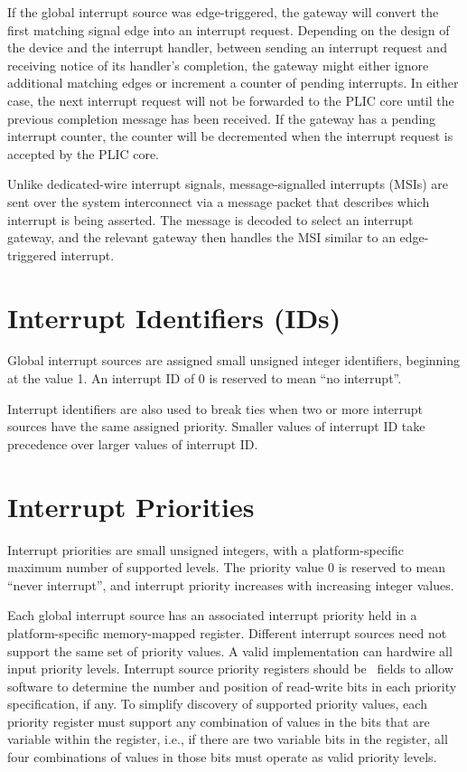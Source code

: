 If the global interrupt source was edge-triggered, the gateway will
convert the first matching signal edge into an interrupt request.
Depending on the design of the device and the interrupt handler,
between sending an interrupt request and receiving notice of its
handler's completion, the gateway might either ignore additional
matching edges or increment a counter of pending interrupts.  In
either case, the next interrupt request will not be forwarded to the
PLIC core until the previous completion message has been received.  If
the gateway has a pending interrupt counter, the counter will be
decremented when the interrupt request is accepted by the PLIC core.

Unlike dedicated-wire interrupt signals, message-signalled interrupts
(MSIs) are sent over the system interconnect via a message packet that
describes which interrupt is being asserted.  The message is decoded
to select an interrupt gateway, and the relevant gateway then handles
the MSI similar to an edge-triggered interrupt.

\section{Interrupt Identifiers (IDs)}

Global interrupt sources are assigned small unsigned integer
identifiers, beginning at the value 1.  An interrupt ID of 0 is
reserved to mean ``no interrupt''.

Interrupt identifiers are also used to break ties when two or more
interrupt sources have the same assigned priority.  Smaller values of
interrupt ID take precedence over larger values of interrupt ID.

\section{Interrupt Priorities}

Interrupt priorities are small unsigned integers, with a
platform-specific maximum number of supported levels.  The priority
value 0 is reserved to mean ``never interrupt'', and interrupt
priority increases with increasing integer values.

Each global interrupt source has an associated interrupt priority held
in a platform-specific memory-mapped register.  Different interrupt
sources need not support the same set of priority values.  A valid
implementation can hardwire all input priority levels.  Interrupt
source priority registers should be \warl\ fields to allow software to
determine the number and position of read-write bits in each priority
specification, if any.  To simplify discovery of supported priority
values, each priority register must support any combination of values
in the bits that are variable within the register, i.e., if there are
two variable bits in the register, all four combinations of values in
those bits must operate as valid priority levels.

